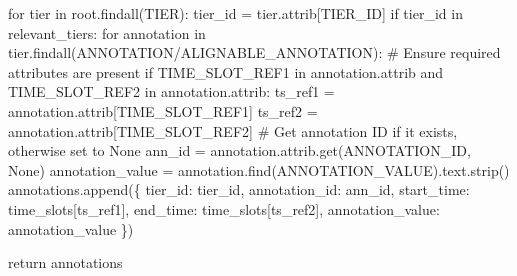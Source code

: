 \documentclass[
  letterpaper,
  DIV=11,
  numbers=noendperiod]{scrreprt}
\newenvironment{Shaded}{\begin{snugshade}}{\end{snugshade}}
\newcommand{\CommentTok}[1]{\textcolor[rgb]{0.37,0.37,0.37}{#1}}
\newcommand{\ControlFlowTok}[1]{\textcolor[rgb]{0.00,0.23,0.31}{#1}}
\newcommand{\KeywordTok}[1]{\textcolor[rgb]{0.00,0.23,0.31}{#1}}
\newcommand{\NormalTok}[1]{\textcolor[rgb]{0.00,0.23,0.31}{#1}}
\newcommand{\OperatorTok}[1]{\textcolor[rgb]{0.37,0.37,0.37}{#1}}
\newcommand{\StringTok}[1]{\textcolor[rgb]{0.13,0.47,0.30}{#1}}
\newcommand{\VariableTok}[1]{\textcolor[rgb]{0.07,0.07,0.07}{#1}}
\begin{document}
\begin{Shaded}
\begin{Highlighting}[]
    \ControlFlowTok{for}\NormalTok{ tier }\KeywordTok{in}\NormalTok{ root.findall(}\StringTok{\textquotesingle{}TIER\textquotesingle{}}\NormalTok{):}
\NormalTok{        tier\_id }\OperatorTok{=}\NormalTok{ tier.attrib[}\StringTok{\textquotesingle{}TIER\_ID\textquotesingle{}}\NormalTok{]}
        \ControlFlowTok{if}\NormalTok{ tier\_id }\KeywordTok{in}\NormalTok{ relevant\_tiers:}
            \ControlFlowTok{for}\NormalTok{ annotation }\KeywordTok{in}\NormalTok{ tier.findall(}\StringTok{\textquotesingle{}ANNOTATION/ALIGNABLE\_ANNOTATION\textquotesingle{}}\NormalTok{):}
                \CommentTok{\# Ensure required attributes are present}
                \ControlFlowTok{if} \StringTok{\textquotesingle{}TIME\_SLOT\_REF1\textquotesingle{}} \KeywordTok{in}\NormalTok{ annotation.attrib }\KeywordTok{and} \StringTok{\textquotesingle{}TIME\_SLOT\_REF2\textquotesingle{}} \KeywordTok{in}\NormalTok{ annotation.attrib:}
\NormalTok{                    ts\_ref1 }\OperatorTok{=}\NormalTok{ annotation.attrib[}\StringTok{\textquotesingle{}TIME\_SLOT\_REF1\textquotesingle{}}\NormalTok{]}
\NormalTok{                    ts\_ref2 }\OperatorTok{=}\NormalTok{ annotation.attrib[}\StringTok{\textquotesingle{}TIME\_SLOT\_REF2\textquotesingle{}}\NormalTok{]}
                    \CommentTok{\# Get annotation ID if it exists, otherwise set to None}
\NormalTok{                    ann\_id }\OperatorTok{=}\NormalTok{ annotation.attrib.get(}\StringTok{\textquotesingle{}ANNOTATION\_ID\textquotesingle{}}\NormalTok{, }\VariableTok{None}\NormalTok{)}
\NormalTok{                    annotation\_value }\OperatorTok{=}\NormalTok{ annotation.find(}\StringTok{\textquotesingle{}ANNOTATION\_VALUE\textquotesingle{}}\NormalTok{).text.strip()}
\NormalTok{                    annotations.append(\{}
                        \StringTok{\textquotesingle{}tier\_id\textquotesingle{}}\NormalTok{: tier\_id,}
                        \StringTok{\textquotesingle{}annotation\_id\textquotesingle{}}\NormalTok{: ann\_id,}
                        \StringTok{\textquotesingle{}start\_time\textquotesingle{}}\NormalTok{: time\_slots[ts\_ref1],}
                        \StringTok{\textquotesingle{}end\_time\textquotesingle{}}\NormalTok{: time\_slots[ts\_ref2],}
                        \StringTok{\textquotesingle{}annotation\_value\textquotesingle{}}\NormalTok{: annotation\_value}
\NormalTok{                    \})}

    \ControlFlowTok{return}\NormalTok{ annotations}


\end{Highlighting}
\end{Shaded}
\end{document}
